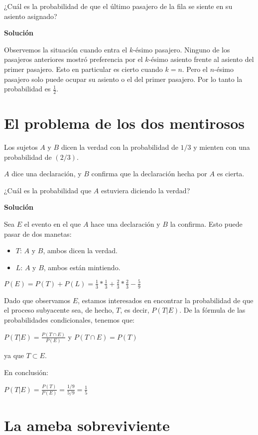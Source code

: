 \documentclass[12pt]{article}
\begin{document}
¿Cuál es la probabilidad de que el último pasajero de la fila se siente en su
asiento asignado?

\textbf{Solución}

Observemos la situación cuando entra el $k$-ésimo pasajero. Ninguno de los
pasajeros anteriores mostró preferencia por el $k$-ésimo asiento frente al
asiento del primer pasajero. Esto en particular es cierto cuando $k=n$. Pero el
$n$-ésimo pasajero solo puede ocupar su asiento o el del primer pasajero. Por lo
tanto la probabilidad es $\frac{1}{2}$.

\section{El problema de los dos mentirosos}

Los sujetos $A$ y $B$ dicen la verdad con la probabilidad de $1/3$ y mienten con
una probabilidad de $(2/3)$.

$A$ dice una declaración, y $B$ confirma que la declaración hecha por $A$ es
cierta.

¿Cuál es la probabilidad que $A$ estuviera diciendo la verdad?

\textbf{Solución}

Sea $E$ el evento en el que $A$ hace una declaración y $B$ la confirma. Esto
puede pasar de dos manetas:

\begin{itemize}
    \item $T$: $A$ y $B$, ambos dicen la verdad.
    \item $L$: $A$ y $B$, ambos están mintiendo.
\end{itemize}

$P(E)=P(T)+P(L)=\frac{1}{3}*\frac{1}{3}+\frac{2}{3}*\frac{2}{3}-\frac{5}{9}$

Dado que observamos $E$, estamos interesados en encontrar la probabilidad de que
el proceso subyacente sea, de hecho, $T$, es decir, $P(T|E)$. De la fórmula de las
probabilidades condicionales, tenemos que:

$P(T|E)=\frac{P(T \cap E)}{P(E)}$  y $P(T \cap E) = P(T)$

ya que $T \subset E$.

En conclusión:

$P(T|E) = \frac{P(T)}{P(E)} = \frac{1/9}{5/9} = \frac{1}{5}$

\section{La ameba sobreviviente}
\end{document}
